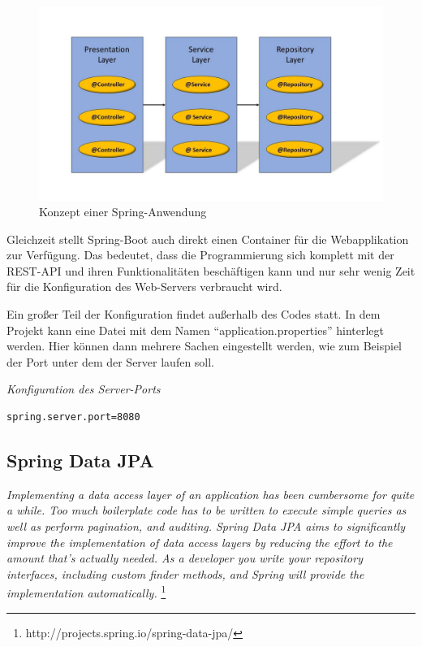 \begin{figure}[htp]     %
\centering
\includegraphics[width=1\textwidth]{bilder/SpringLayers} 
\caption[Der Grafik \url{http://image.slidesharecdn.com/springsourceusi2009v3-0-090702135517-phpapp01/95/developing-modular-java-applications-13-728.jpg?cb=1246543977} nachempfunden]{Konzept einer Spring-Anwendung}
\end{figure} 

Gleichzeit stellt Spring-Boot auch direkt einen Container für die Webapplikation zur Verfügung. Das bedeutet, dass die Programmierung sich komplett mit der REST-API und ihren Funktionalitäten beschäftigen kann und nur sehr wenig Zeit für die Konfiguration des Web-Servers verbraucht wird.

Ein großer Teil der Konfiguration findet außerhalb des Codes statt. In dem Projekt kann eine Datei mit dem Namen ``application.properties'' hinterlegt werden. Hier können dann mehrere Sachen eingestellt werden, wie zum Beispiel der Port unter dem der Server laufen soll.

\begin{minipage}{\textwidth}
\emph{Konfiguration des Server-Ports}
\begin{lstlisting}
spring.server.port=8080
\end{lstlisting} 
\end{minipage}

\subsection{Spring Data JPA}

\emph{\glqq   
Implementing a data access layer of an application has been cumbersome for quite a while. Too much boilerplate code has to be written to execute simple queries as well as perform pagination, and auditing. Spring Data JPA aims to significantly improve the implementation of data access layers by reducing the effort to the amount that’s actually needed. As a developer you write your repository interfaces, including custom finder methods, and Spring will provide the implementation automatically.
\grqq} \footnote{http://projects.spring.io/spring-data-jpa/} \\

